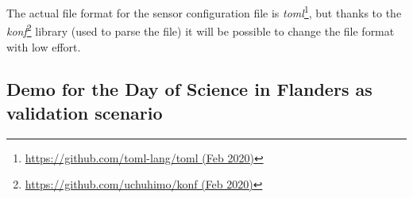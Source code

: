 % 
The actual file format for the sensor configuration file is \textit{toml}\footnote{\href{https://github.com/toml-lang/toml}{https://github.com/toml-lang/toml (Feb 2020)}}, but thanks to the \textit{konf}\footnote{\href{https://github.com/uchuhimo/konf}{https://github.com/uchuhimo/konf (Feb 2020)}} library (used to parse the file) it will be possible to change the file format with low effort.

\subsection{Demo for the Day of Science in Flanders as validation \mbox{scenario}}

